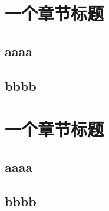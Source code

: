 \documentclass[fontset=fandol,openany]{ctexbook}
\begin{document}
\chapter{一个章节标题}
\section{aaaa}
\zhlipsum[1-3]
\section{bbbb}
\zhlipsum[1-3]

\chapter{一个章节标题}
\section{aaaa}
\zhlipsum[1-3]
\section{bbbb}
\zhlipsum[1-3]
\end{document}
